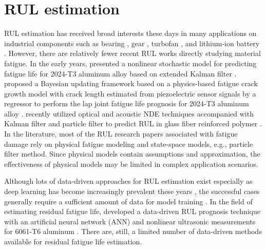 \section{RUL estimation}
RUL estimation has received broad interests these days in many applications on industrial components such as bearing \cite{rul-nn-bearing-BENALI2015150, rul-cnn-bearing-LI20181, rul-ensemble-bearing}, gear \cite{rul-review-gear}, turbofan \cite{rul-statespace-turbo-battery-Mosallam2016,rul-cnn-turbo-LI20181,rul-rnn-turbo-WU2020241}, and lithium-ion battery \cite{rul-statespace-turbo-battery-Mosallam2016,rul-review-battery-LIPU2018115,rul-gpr-battery-9040661}. However, there are relatively fewer recent RUL works directly studying material fatigue. In the early years,  presented a nonlinear stochastic model for predicting fatigue life for 2024-T3 aluminum alloy based on extended Kalman filter \cite{rul-statespace-fatigue-RAY1996}.  proposed a Bayesian updating framework based on a physics-based fatigue crack growth model with crack length estimated from piezoelectric sensor signals by a regressor to perform the lap joint fatigue life prognosis for 2024-T3 aluminum alloy \cite{rul-statespace-fatigue-PENG2015}.  recently utilized optical and acoustic NDE techniques accompanied with Kalman filter and particle filter to predict RUL in glass fiber reinforced polymer \cite{rul-statespace-fatigue-8819426}. In the literature, most of the RUL research papers associated with fatigue damage rely on physical fatigue modeling and state-space models, e.g., particle filter method. Since physical models contain assumptions and approximation, the effectiveness of physical models may be limited in complex application scenarios.

 Although lots of data-driven approaches for RUL estimation exist \cite{rul-review-SI20111, rul-review-LEI2018799} especially as deep learning has become increasingly prevalent these years \cite{rul-review-KHAN2018241}, the successful cases generally require a sufficient amount of data for model training \cite{rul-cnn-bearing-LI20181, rul-ensemble-bearing, rul-cnn-turbo-LI20181,rul-rnn-turbo-WU2020241, rul-gpr-battery-9040661}. In the field of estimating residual fatigue life,  developed a data-driven RUL prognosis technique with an artificial neural network (ANN) and nonlinear ultrasonic measurements for 6061-T6 aluminum \cite{rul-nn-fatigue-ultrasound-LIM2018185}. There are, still, a limited number of data-driven methods available for residual fatigue life estimation. 

